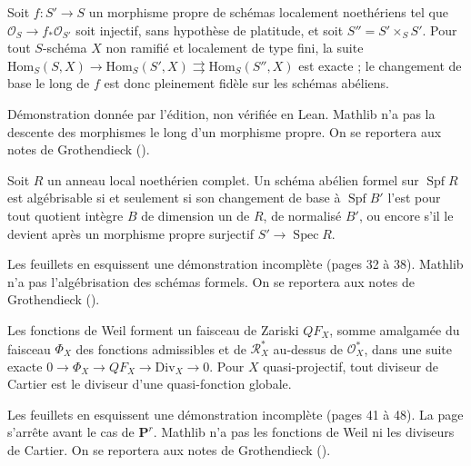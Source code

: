 \begin{encadre}
\begin{conjecture*}
Soit $f : S' \to S$ un morphisme propre de schémas localement noethériens tel que $\mathcal O_S \to f_*\mathcal O_{S'}$ soit injectif, sans hypothèse de platitude, et soit $S'' = S' \times_S S'$. Pour tout $S$-schéma $X$ non ramifié et localement de type fini, la suite $\mathrm{Hom}_S(S, X) \to \mathrm{Hom}_S(S', X) \rightrightarrows \mathrm{Hom}_S(S'', X)$ est exacte ; le changement de base le long de $f$ est donc pleinement fidèle sur les schémas abéliens.
\end{conjecture*}
\end{encadre}
{\small Démonstration donnée par l'édition, non vérifiée en Lean. Mathlib n'a pas la descente des morphismes le long d'un morphisme propre. On se reportera aux notes de Grothendieck ().\par}

\begin{encadre}
\begin{conjecture*}
Soit $R$ un anneau local noethérien complet. Un schéma abélien formel sur $\operatorname{Spf} R$ est algébrisable si et seulement si son changement de base à $\operatorname{Spf} B'$ l'est pour tout quotient intègre $B$ de dimension un de $R$, de normalisé $B'$, ou encore s'il le devient après un morphisme propre surjectif $S' \to \operatorname{Spec} R$.
\end{conjecture*}
\end{encadre}
{\small Les feuillets en esquissent une démonstration incomplète (pages 32 à 38). Mathlib n'a pas l'algébrisation des schémas formels. On se reportera aux notes de Grothendieck ().\par}

\begin{encadre}
\begin{conjecture*}
Les fonctions de Weil forment un faisceau de Zariski $QF_X$, somme amalgamée du faisceau $\Phi_X$ des fonctions admissibles et de $\mathcal R^*_X$ au-dessus de $\mathcal O^*_X$, dans une suite exacte $0 \to \Phi_X \to QF_X \to \mathrm{Div}_X \to 0$. Pour $X$ quasi-projectif, tout diviseur de Cartier est le diviseur d'une quasi-fonction globale.
\end{conjecture*}
\end{encadre}
{\small Les feuillets en esquissent une démonstration incomplète (pages 41 à 48). La page s'arrête avant le cas de $\mathbf P^r$. Mathlib n'a pas les fonctions de Weil ni les diviseurs de Cartier. On se reportera aux notes de Grothendieck ().\par}

